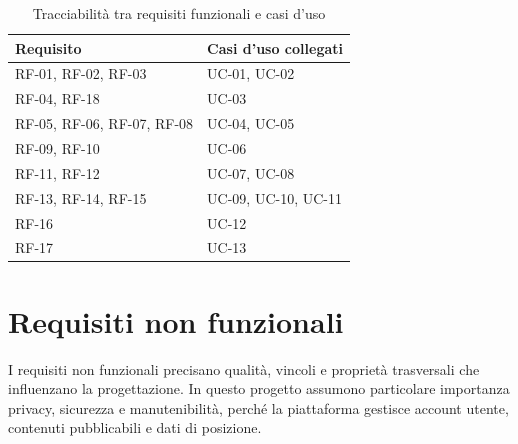 \begin{table}[H]
    \centering
    \caption{Tracciabilità tra requisiti funzionali e casi d'uso}
    \label{tab:tracciabilita-requisiti-casi-uso}
    \small
    \begin{tabularx}{\textwidth}{p{}X}
        \toprule
        \textbf{Requisito} & \textbf{Casi d'uso collegati} \\
        \midrule
        RF-01, RF-02, RF-03 & UC-01, UC-02 \\
        RF-04, RF-18 & UC-03 \\
        RF-05, RF-06, RF-07, RF-08 & UC-04, UC-05 \\
        RF-09, RF-10 & UC-06 \\
        RF-11, RF-12 & UC-07, UC-08 \\
        RF-13, RF-14, RF-15 & UC-09, UC-10, UC-11 \\
        RF-16 & UC-12 \\
        RF-17 & UC-13 \\
        \bottomrule
    \end{tabularx}
\end{table}

\section{Requisiti non funzionali}
\label{sec:requisiti-non-funzionali}

I requisiti non funzionali precisano qualità, vincoli e proprietà trasversali che influenzano la progettazione. In questo progetto assumono particolare importanza privacy, sicurezza e manutenibilità, perché la piattaforma gestisce account utente, contenuti pubblicabili e dati di posizione.

